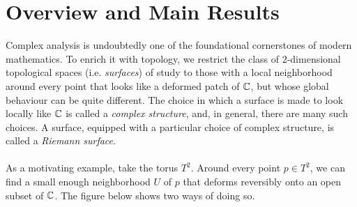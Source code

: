 \documentclass[../Moduli_Spaces_of_Riemann_Surfaces.tex]{subfiles}
\begin{document}
    \section{Overview and Main Results}
    Complex analysis is undoubtedly one of the foundational cornerstones of modern mathematics. To enrich it with topology, we restrict the class of $2$-dimensional topological spaces (i.e. \textit{surfaces}) of study to those with a local neighborhood around every point that looks like a deformed patch of $\mathbb{C}$, but whose global behaviour can be quite different. The choice in which a surface is made to look locally like $\mathbb{C}$ is called a \textit{complex structure}, and, in general, there are many such choices. A surface, equipped with a particular choice of complex structure, is called a \textit{Riemann surface}.\\\ \\
    As a motivating example, take the torus $T^2$. Around every point $p\in T^2$, we can find a small enough neighborhood $U$ of $p$ that deforms reversibly onto an open subset of $\mathbb{C}$. The figure below shows two ways of doing so.
\end{document}
